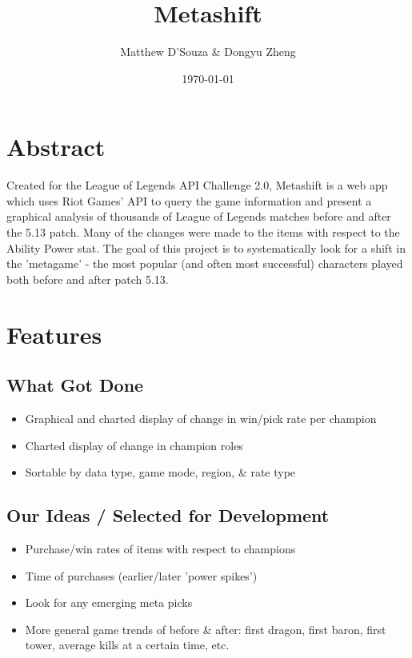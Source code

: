 \documentclass{article}
\title{Metashift}
\date{\today}
\author{Matthew D'Souza \& Dongyu Zheng}
\begin{document}
\maketitle
{}

\newpage
\tableofcontents

\newpage
{}



\section{Abstract}

Created for the League of Legends API Challenge 2.0, Metashift is a web app which uses Riot Games' API to query the game information and present a graphical analysis of thousands of League of Legends matches before and after the 5.13 patch. Many of the changes were made to the items with respect to the Ability Power stat. The goal of this project is to systematically look for a shift in the 'metagame' - the most popular (and often most successful) characters played both before and after patch 5.13.


\section{Features}

\subsection{What Got Done}
\begin{itemize}
    \item Graphical and charted display of change in win/pick rate per champion
    \item Charted display of change in champion roles 
    \item Sortable by data type, game mode, region, \& rate type
\end{itemize}

\subsection{Our Ideas / Selected for Development}
\begin{itemize}
    \item Purchase/win rates of items with respect to champions
    \item Time of purchases (earlier/later 'power spikes')
    \item Look for any emerging meta picks
    \item More general game trends of before \& after: first dragon, first baron, first tower, average kills at a certain time, etc.
\end{itemize}
\end{document}
